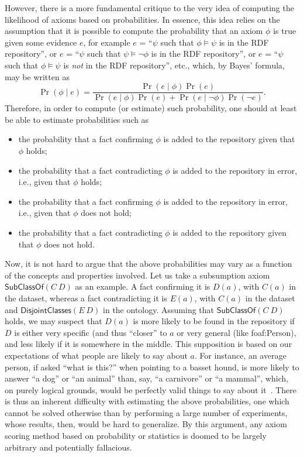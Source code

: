 \documentclass{llncs}
\begin{document}
However, there is a more fundamental critique to the very idea of computing the likelihood
of axioms based on probabilities. In essence, this idea relies on the assumption
that it is possible to compute the probability that an axiom $\phi$ is true given
some evidence $e$, for example $e$ = ``$\psi$ such that $\phi\models\psi$ is in the RDF repository'',
or $e$ = ``$\psi$ such that $\psi\models\neg\phi$ is in the RDF repository'',
or $e$ = ``$\psi$ such that $\phi\models\psi$ is \emph{not} in the RDF repository'', etc.,
which, by Bayes' formula, may be written as
\begin{equation}
  \Pr(\phi \mid e) = \frac{\Pr(e \mid \phi)\Pr(e)}{\Pr(e \mid \phi)\Pr(e) + \Pr(e \mid \neg\phi)\Pr(\neg e)}.
\end{equation}
Therefore, in order to compute (or estimate) such probability,
one should at least be able to estimate probabilities such as
\begin{itemize}
\item the probability that a fact confirming $\phi$ is added to the repository
  given that $\phi$ holds;
\item the probability that a fact contradicting $\phi$ is added to the repository
  in error, i.e., given that $\phi$ holds;
\item the probability that a fact confirming $\phi$ is added to the repository
  in error, i.e., given that $\phi$ does not hold;
\item the probability that a fact contradicting $\phi$ is added to the repository
  given that $\phi$ does not hold.
\end{itemize}
Now, it is not hard to argue that the above probabilities may vary as a function of the
concepts and properties involved. Let us take a subsumption axiom $\mathsf{SubClassOf}(C\ D)$
as an example. A fact confirming it is $D(a)$, with $C(a)$ in the dataset,
whereas a fact contradicting it is $E(a)$, with $C(a)$ in the dataset
and $\mathsf{DisjointClasses}(E\ D)$ in the ontology.
Assuming that $\mathsf{SubClassOf}(C\ D)$ holds, we may suspect that
$D(a)$ is more likely to be found in the repository
if $D$ is either very specific (and thus ``closer'' to $a$ or very general (like
\textsf{foaf:Person}), and less likely if it is somewhere in the middle.
This supposition is based on our expectations of what people are likely to say
about $a$. For instance, an average person, if asked ``what is this?'' when pointing
to a basset hound, is more likely to answer ``a dog'' or ``an animal'' than,
say, ``a carnivore'' or ``a mammal'', which, on purely logical grounds,
would be perfectly valid things to say about it~\cite{Lakoff1987}.
There is thus an inherent difficulty with estimating the above probabilities,
one which cannot be solved otherwise than by performing a large number of
experiments, whose results, then, would be hard to generalize.
By this argument, any axiom scoring method based on probability or statistics is doomed
to be largely arbitrary and potentially fallacious.
\end{document}
